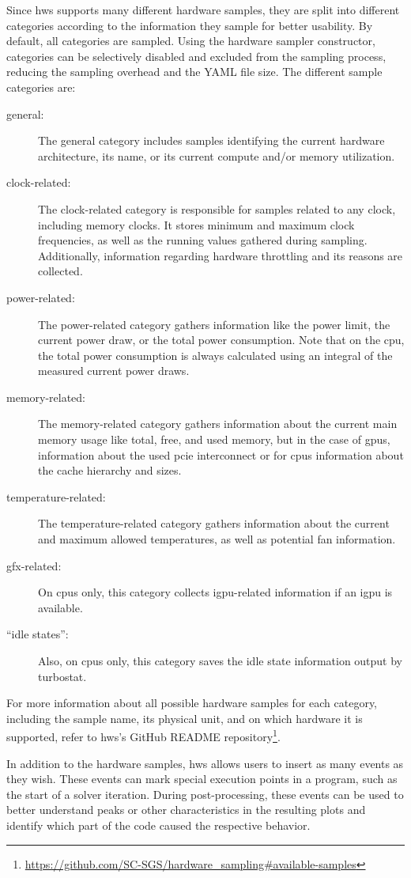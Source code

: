 Since hws supports many different hardware samples, they are split into different categories according to the information they sample for better usability. 
By default, all categories are sampled. 
Using the hardware sampler constructor, categories can be selectively disabled and excluded from the sampling process, reducing the sampling overhead and the YAML file size. 
The different sample categories are:
\begin{description}
    \item[general:]%
    The general category includes samples identifying the current hardware architecture, its name, or its current compute and/or memory utilization.
    \item[clock-related:]%
    The clock-related category is responsible for samples related to any clock, including memory clocks. 
    It stores minimum and maximum clock frequencies, as well as the running values gathered during sampling. 
    Additionally, information regarding hardware throttling and its reasons are collected.
    \item[power-related:]%
    The power-related category gathers information like the power limit, the current power draw, or the total power consumption. 
    Note that on the \gls{cpu}, the total power consumption is always calculated using an integral of the measured current power draws. 
    \item[memory-related:]%
    The memory-related category gathers information about the current main memory usage like total, free, and used memory, but in the case of \glspl{gpu}, information about the used \gls{pcie} interconnect or for \glspl{cpu} information about the cache hierarchy and sizes. 
    \item[temperature-related:]%
    The temperature-related category gathers information about the current and maximum allowed temperatures, as well as potential fan information. 
    \item[gfx-related:]%
    On \glspl{cpu} only, this category collects i\gls{gpu}-related information if an i\gls{gpu} is available. 
    \item[\enquote{idle states}:]%
    Also, on \glspl{cpu} only, this category saves the idle state information output by turbostat.
\end{description}
For more information about all possible hardware samples for each category, including the sample name, its physical unit, and on which hardware it is supported, refer to hws's GitHub README repository\footnote{\url{https://github.com/SC-SGS/hardware_sampling\#available-samples}}.

In addition to the hardware samples, hws allows users to insert as many events as they wish. 
These events can mark special execution points in a program, such as the start of a solver iteration. 
During post-processing, these events can be used to better understand peaks or other characteristics in the resulting plots and identify which part of the code caused the respective behavior. 
